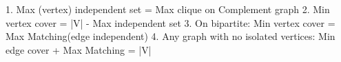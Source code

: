 1. Max (vertex) independent set = Max clique on Complement graph
2. Min vertex cover = |V| - Max independent set
3. On bipartite: Min vertex cover = Max Matching(edge independent)
4. Any graph with no isolated vertices: Min edge cover + Max Matching = |V|
